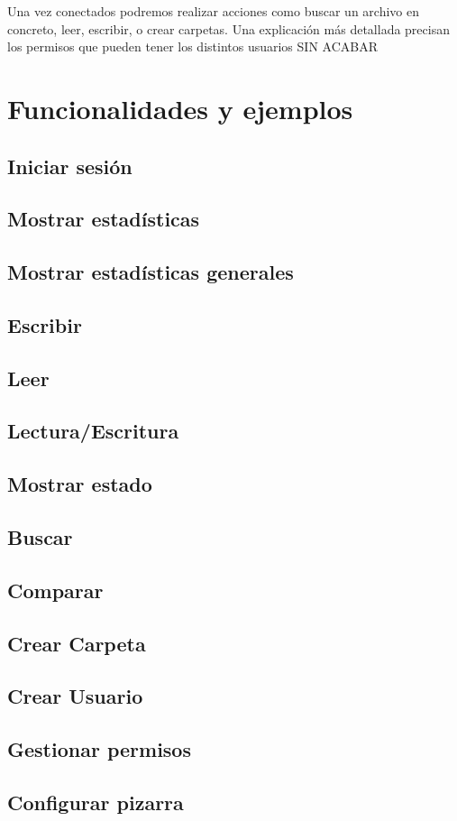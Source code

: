 Una vez conectados podremos realizar acciones como buscar un archivo en concreto, leer, escribir, o crear carpetas. Una explicación más detallada precisan los permisos que pueden tener los distintos usuarios  SIN ACABAR
\color{black}
\section{Funcionalidades y ejemplos}
\subsection{Iniciar sesión}
\subsection{Mostrar estadísticas}
\subsection{Mostrar estadísticas generales}
\subsection{Escribir}
\subsection{Leer}
\subsection{Lectura/Escritura}
\subsection{Mostrar estado}
\subsection{Buscar}
\subsection{Comparar}
\subsection{Crear Carpeta}
\subsection{Crear Usuario}
\subsection{Gestionar permisos}
\subsection{Configurar pizarra}
